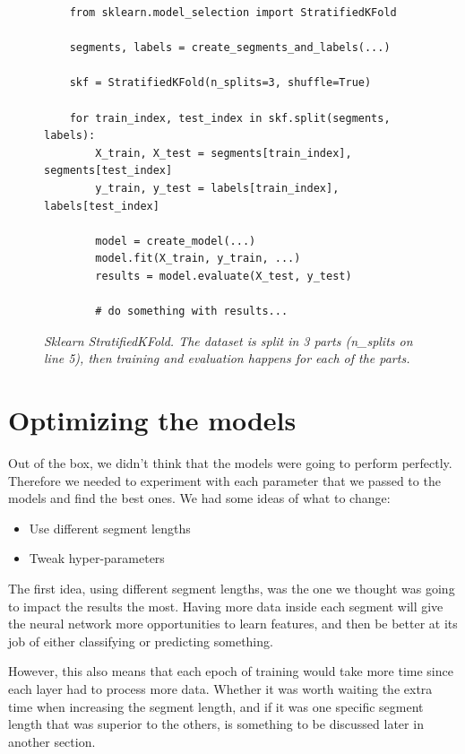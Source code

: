 \begin{figure}
\begin{code}    
    \begin{verbatim}
    from sklearn.model_selection import StratifiedKFold

    segments, labels = create_segments_and_labels(...)

    skf = StratifiedKFold(n_splits=3, shuffle=True)

    for train_index, test_index in skf.split(segments, labels):
        X_train, X_test = segments[train_index], segments[test_index]
        y_train, y_test = labels[train_index], labels[test_index]

        model = create_model(...)
        model.fit(X_train, y_train, ...)
        results = model.evaluate(X_test, y_test)

        # do something with results...

    \end{verbatim}
    \caption{\textit{Sklearn StratifiedKFold. The dataset is split in 3 parts (n\_splits on line 5), then training and evaluation happens for each of the parts.}}
    \label{code:sklearn_k_fold}
\end{code}
\end{figure}

\section{Optimizing the models}

\noindent Out of the box, we didn't think that the models were going to perform perfectly. Therefore we needed to experiment with each parameter that we passed to the models and find the best ones. We had some ideas of what to change:

\begin{itemize}
    \item Use different segment lengths
    \item Tweak hyper-parameters
\end{itemize}

\noindent The first idea, using different segment lengths, was the one we thought was going to impact the results the most. Having more data inside each segment will give the neural network more opportunities to learn features, and then be better at its job of either classifying or predicting something. 

However, this also means that each epoch of training would take more time since each layer had to process more data. Whether it was worth waiting the extra time when increasing the segment length, and if it was one specific segment length that was superior to the others, is something to be discussed later in another section. 

